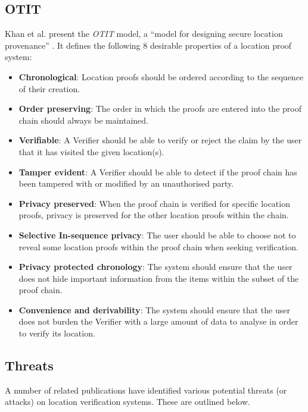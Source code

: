 \subsection{OTIT} \label{ssec:otit}
Khan et al. present the \textit{OTIT} model, a ``model for designing secure location provenance'' \cite{otit}. It defines the following 8 desirable properties of a location proof system:
\begin{itemize}
	\item[] \textbf{Chronological}: Location proofs should be ordered according to the sequence of their creation.
	\item[] \textbf{Order preserving}: The order in which the proofs are entered into the proof chain should always be maintained.
	\item[] \textbf{Verifiable}: A Verifier should be able to verify or reject the claim by the user that it has visited the given location(s).
	\item[] \textbf{Tamper evident}: A Verifier should be able to detect if the proof chain has been tampered with or modified by an unauthorised party.
	\item[] \textbf{Privacy preserved}: When the proof chain is verified for specific location proofs, privacy is preserved for the other location proofs within the chain.
	\item[] \textbf{Selective In-sequence privacy}: The user should be able to choose not to reveal some location proofs within the proof chain when seeking verification.
	\item[] \textbf{Privacy protected chronology}: The system should ensure that the user does not hide important information from the items within the subset of the proof chain.
	\item[] \textbf{Convenience and derivability}: The system should ensure that the user does not burden the Verifier with a large amount of data to analyse in order to verify its location.
\end{itemize}

\subsection{Threats} \label{ssec:threats}
A number of related publications \cite{luo,khan} have identified various potential threats (or attacks) on location verification systems. These are outlined below.

